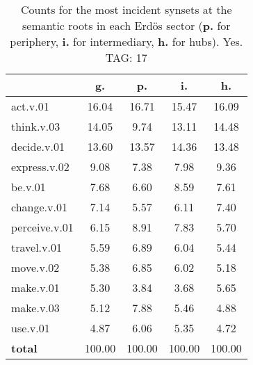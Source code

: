 \begin{table}[h!]
\begin{center}
\begin{tabular}{| l || c | c | c | c |}\hline
 & {\bf g.} & {\bf p.} & {\bf i.} & {\bf h.} \\\hline\hline
act.v.01 & 16.04  & 16.71  & 15.47  & 16.09 \\\hline
think.v.03 & 14.05  & 9.74  & 13.11  & 14.48 \\\hline
decide.v.01 & 13.60  & 13.57  & 14.36  & 13.48 \\\hline
express.v.02 & 9.08  & 7.38  & 7.98  & 9.36 \\\hline
be.v.01 & 7.68  & 6.60  & 8.59  & 7.61 \\\hline
change.v.01 & 7.14  & 5.57  & 6.11  & 7.40 \\\hline
perceive.v.01 & 6.15  & 8.91  & 7.83  & 5.70 \\\hline
travel.v.01 & 5.59  & 6.89  & 6.04  & 5.44 \\\hline
move.v.02 & 5.38  & 6.85  & 6.02  & 5.18 \\\hline
make.v.01 & 5.30  & 3.84  & 3.68  & 5.65 \\\hline
make.v.03 & 5.12  & 7.88  & 5.46  & 4.88 \\\hline
use.v.01 & 4.87  & 6.06  & 5.35  & 4.72 \\\hline\hline
{{\bf total}} & 100.00  & 100.00  & 100.00  & 100.00 \\\hline
\end{tabular}
\caption{Counts for the most incident synsets at the semantic roots in each Erd\"os sector ({\bf p.} for periphery, {\bf i.} for intermediary, {\bf h.} for hubs). Yes. TAG: 17}
\end{center}
\end{table}